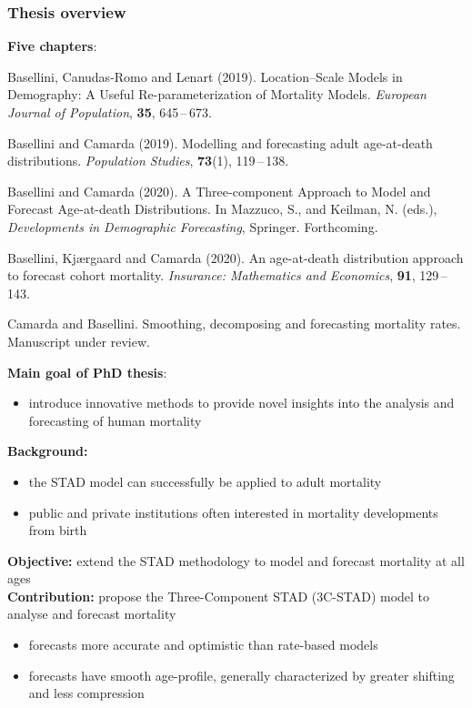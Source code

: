 \documentclass[12pt, xcolor=table]{beamer}  %
\begin{document}
\begin{frame}[plain]\frametitle{Thesis overview}
	\textbf{Five chapters}: 
	\begin{itemize}
		\scriptsize	
		\item { Basellini, Canudas-Romo and Lenart (2019). Location--Scale Models in Demography: A Useful Re-parameterization of Mortality Models. {\it European Journal of Population}, {\bf 35}, 645\,--\,673. 	
		
		\item   Basellini and Camarda (2019). Modelling and forecasting adult age-at-death distributions. {\it Population Studies}, {\bf 73}(1), 119\,--\,138. }
		
		\item  { Basellini and Camarda (2020). A Three-component Approach to Model and Forecast Age-at-death Distributions. In Mazzuco, S., and Keilman, N. (eds.), {\it Developments in Demographic Forecasting}, Springer. Forthcoming. }
			
		\item { Basellini, Kj{\ae}rgaard and Camarda (2020). An age-at-death distribution approach \\ to forecast cohort mortality. {\it Insurance: Mathematics and Economics}, {\bf 91}, 129\,--\,143.	
			
		\item Camarda and Basellini. Smoothing, decomposing and forecasting mortality rates. Manuscript under review. }	
	\end{itemize}
	\bigskip
	{\pgfsetfillopacity{1} 
		\textbf{Main goal of PhD thesis}: 
		\begin{itemize}
			\item introduce innovative methods to provide novel insights into the analysis and forecasting of human mortality	
		\end{itemize}
	}
\end{frame}


\begin{frame} 
	\textbf{Background:}
	\begin{itemize}
		\setlength\itemsep{0.5em}
		\item the STAD model can successfully be applied to adult mortality 
		\item public and private institutions often interested in mortality developments from birth
	\end{itemize}
	\bigskip \pause
	\textbf{Objective:} extend the STAD methodology to model and forecast mortality at all ages
	\\ \bigskip \pause
	\textbf{Contribution:} propose the Three-Component STAD (3C-STAD) model to analyse and forecast mortality
	\begin{itemize}
		\setlength\itemsep{0.5em}
		\item forecasts more accurate and optimistic than rate-based models 
		\item forecasts have smooth age-profile, generally characterized by greater shifting and less compression
	\end{itemize}
	
\end{frame}
\end{document}
